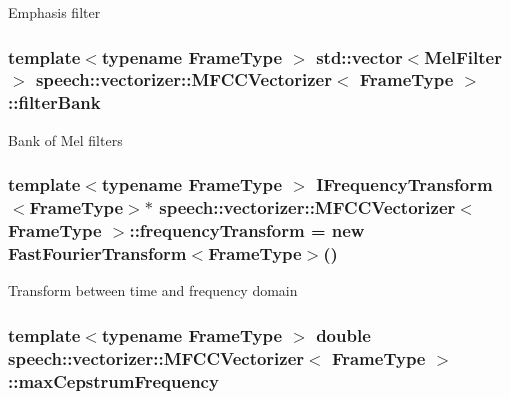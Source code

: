 Emphasis filter \hypertarget{classspeech_1_1vectorizer_1_1MFCCVectorizer_ab24511b7854870d534bdc408ddaf43bb}{
\subsubsection[{filter\+Bank}]{\setlength{\rightskip}{0pt plus 5cm}template$<$typename Frame\+Type $>$ std\+::vector$<${\bf Mel\+Filter}$>$ {\bf speech\+::vectorizer\+::\+M\+F\+C\+C\+Vectorizer}$<$ Frame\+Type $>$\+::filter\+Bank\hspace{0.3cm}{\ttfamily [protected]}}}\label{classspeech_1_1vectorizer_1_1MFCCVectorizer_ab24511b7854870d534bdc408ddaf43bb}
Bank of Mel filters \hypertarget{classspeech_1_1vectorizer_1_1MFCCVectorizer_ac63aa92505370502b5e7c456bf8a8255}{
\subsubsection[{frequency\+Transform}]{\setlength{\rightskip}{0pt plus 5cm}template$<$typename Frame\+Type $>$ {\bf I\+Frequency\+Transform}$<$Frame\+Type$>$$\ast$ {\bf speech\+::vectorizer\+::\+M\+F\+C\+C\+Vectorizer}$<$ Frame\+Type $>$\+::frequency\+Transform = new {\bf Fast\+Fourier\+Transform}$<$Frame\+Type$>$()\hspace{0.3cm}{\ttfamily [protected]}}}\label{classspeech_1_1vectorizer_1_1MFCCVectorizer_ac63aa92505370502b5e7c456bf8a8255}
Transform between time and frequency domain \hypertarget{classspeech_1_1vectorizer_1_1MFCCVectorizer_a50431c541e9cba136395055ffd076c70}{
\subsubsection[{max\+Cepstrum\+Frequency}]{\setlength{\rightskip}{0pt plus 5cm}template$<$typename Frame\+Type $>$ double {\bf speech\+::vectorizer\+::\+M\+F\+C\+C\+Vectorizer}$<$ Frame\+Type $>$\+::max\+Cepstrum\+Frequency\hspace{0.3cm}{\ttfamily [protected]}}}\label{classspeech_1_1vectorizer_1_1MFCCVectorizer_a50431c541e9cba136395055ffd076c70}
